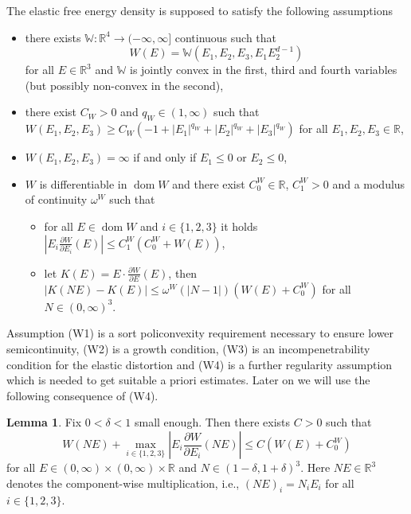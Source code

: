 \documentclass[a4paper,10pt,oneside]{amsbook}
\numberwithin{section}{chapter}
\numberwithin{equation}{chapter}
\theoremstyle{definition}
\newtheorem{lemma}[prop]{Lemma}
\DeclareMathOperator{\dom}{dom}
\newcommand{\dind}[2]{\frac{\partial #1}{\partial #2}}
\begin{document}
The elastic free energy density is supposed to satisfy the following assumptions
\begin{itemize}[itemsep=1em]
\item[(W1)] there exists $\mathbb{W}\colon\mathbb{R}^4\to(-\infty,\infty]$ continuous such that
\[
W(E)=\mathbb{W}(E_1,E_2,E_3,E_1E_2^{d-1})
\]
for all $E\in\mathbb{R}^3$ and $\mathbb{W}$ is jointly convex in the first, third and fourth variables (but possibly non-convex in the second),
\item[(W2)] there exist $C_W>0$ and $q_W\in(1,\infty)$ such that $W(E_1,E_2,E_3)\ge C_W(-1+|E_1|^{q_W}+|E_2|^{q_W}+|E_3|^{q_W})$ for all $E_1,E_2,E_3\in\mathbb{R}$,
\item[(W3)] $W(E_1,E_2,E_3)=\infty$ if and only if $E_1\le0$ or $E_2\le0$,
\item[(W4)] $W$ is differentiable in $\dom W$ and there exist $C^W_0\in\mathbb{R}$, $C^W_1>0$ and a modulus of continuity $\omega^W$ such that
\begin{itemize}
\item[(i)] for all $E\in\dom W$ and $i\in\{1,2,3\}$ it holds $\left|E_i\dind{W}{E_i}(E)\right|\le C_1^W(C_0^W+W(E))$,
\item[(ii)] let $K(E)=E\cdot\dind{W}{E}(E)$, then $|K(NE)-K(E)|\le\omega^W(|N-1|)(W(E)+C_0^W)$ for all $N\in(0,\infty)^3$.
\end{itemize}
\end{itemize}
Assumption (W1) is a sort policonvexity requirement necessary to ensure lower semicontinuity, (W2) is a growth condition, (W3) is an incompenetrability condition for the elastic distortion and (W4) is a further regularity assumption which is needed to get suitable a priori estimates. Later on we will use the following consequence of (W4).
\begin{lemma}
\label{lemma:tipo-ball-kirchhoff-control}
Fix $0<\delta<1$ small enough. Then there exists $C>0$ such that
\[
W(NE)+\max_{i\in\{1,2,3\}}\left|E_i\dind{W}{E_i}(NE)\right|\le C(W(E)+C_0^W)
\]
for all $E\in(0,\infty)\times(0,\infty)\times\mathbb{R}$ and $N\in(1-\delta,1+\delta)^3$. Here $NE\in\mathbb{R}^3$ denotes the component-wise multiplication, i.e., $(NE)_i=N_iE_i$ for all $i\in\{1,2,3\}$.
\end{lemma}
\end{document}
